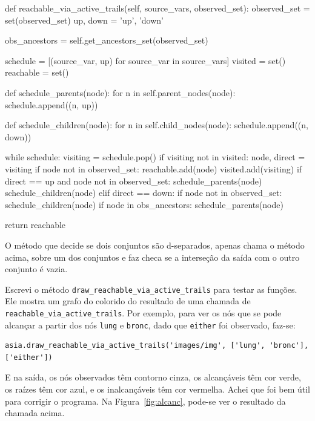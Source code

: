 \documentclass[paper=a4, fontsize=11pt]{scrartcl} %
\numberwithin{equation}{subsection}
\numberwithin{figure}{subsection}
\numberwithin{table}{subsection}
\numberwithin{definition}{subsection}
\numberwithin{theorem}{subsection}
\numberwithin{property}{subsection}
\numberwithin{proposition}{subsection}
\numberwithin{equation}{section}
\numberwithin{figure}{section}
\numberwithin{table}{section}
\numberwithin{definition}{section}
\numberwithin{theorem}{section}
\numberwithin{property}{section}
\numberwithin{proposition}{section}
\begin{document}
\begin{python}
    def reachable_via_active_trails(self, source_vars, observed_set):
        observed_set = set(observed_set)
        up, down = 'up', 'down'

        obs_ancestors = self.get_ancestors_set(observed_set)

        schedule = [(source_var, up) for source_var in source_vars]
        visited = set()
        reachable = set()

        def schedule_parents(node):
            for n in self.parent_nodes(node):
                schedule.append((n, up))

        def schedule_children(node):
            for n in self.child_nodes(node):
                schedule.append((n, down))

        while schedule:
            visiting = schedule.pop()
            if visiting not in visited:
                node, direct = visiting
                if node not in observed_set:
                    reachable.add(node)
                visited.add(visiting)
                if direct == up and node not in observed_set:
                    schedule_parents(node)
                    schedule_children(node)
                elif direct == down:
                    if node not in observed_set:
                        schedule_children(node)
                    if node in obs_ancestors:
                        schedule_parents(node)

        return reachable
\end{python}

O método que decide se dois conjuntos são d-separados, apenas chama o método acima, sobre um dos conjuntos e faz checa se a interseção da saída com o outro conjunto é vazia.

Escrevi o método \verb|draw_reachable_via_active_trails| para testar as funções. Ele mostra um grafo do colorido do resultado de uma chamada de \verb|reachable_via_active_trails|. Por exemplo, para ver os nós que se pode alcançar a partir dos nós \verb|lung| e \verb|bronc|, dado que \verb|either| foi observado, faz-se:
\begin{verbatim}
asia.draw_reachable_via_active_trails('images/img', ['lung', 'bronc'], ['either'])
\end{verbatim}

E na saída, os nós observados têm contorno cinza, os alcançáveis têm cor verde, os raízes têm cor azul, e os inalcançáveis têm cor vermelha. Achei que foi bem útil para corrigir o programa. Na Figura~\ref{fig:alcanc}, pode-se ver o resultado da chamada acima.
\end{document}
